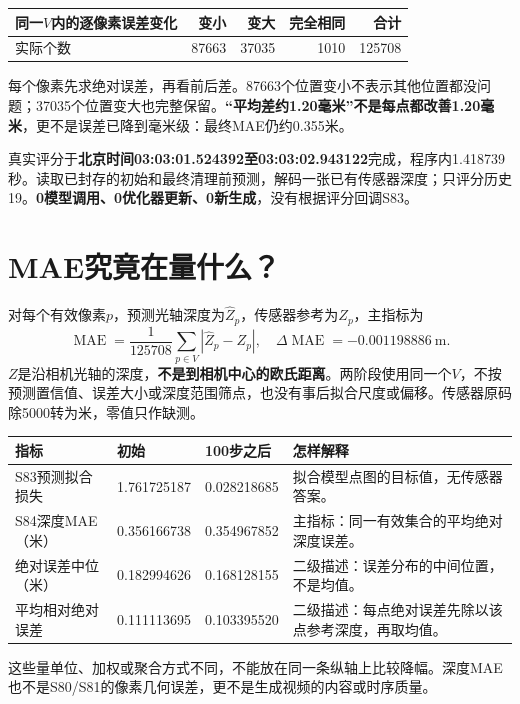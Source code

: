 \documentclass[UTF8,11pt,a4paper]{ctexart}
\begin{document}
\begin{center}\small
\begin{tabular}{lrrrr}\toprule
同一$V$内的逐像素误差变化&变小&变大&完全相同&合计\\\midrule
实际个数&87663&37035&1010&125708\\\bottomrule
\end{tabular}\end{center}
每个像素先求绝对误差，再看前后差。87663个位置变小不表示其他位置都没问题；37035个位置变大也完整保留。\textbf{“平均差约1.20毫米”不是每点都改善1.20毫米}，更不是误差已降到毫米级：最终MAE仍约0.355米。

真实评分于\textbf{北京时间03:03:01.524392至03:03:02.943122}完成，程序内1.418739秒。读取已封存的初始和最终清理前预测，解码一张已有传感器深度；只评分历史19。\textbf{0模型调用、0优化器更新、0新生成}，没有根据评分回调S83。
\clearpage

\section{ MAE究竟在量什么？}
对每个有效像素$p$，预测光轴深度为$\hat Z_p$，传感器参考为$Z_p$，主指标为
\[
\operatorname{MAE}=\frac{1}{125708}\sum_{p\in V}|\hat Z_p-Z_p|,
\quad \Delta\operatorname{MAE}=-0.001198886\ \mathrm{m}.
\]
$Z$是沿相机光轴的深度，\textbf{不是到相机中心的欧氏距离}。两阶段使用同一个$V$，不按预测置信值、误差大小或深度范围筛点，也没有事后拟合尺度或偏移。传感器原码除5000转为米，零值只作缺测。

\begin{center}\small
\begin{tabular}{p{3.6cm}p{3.0cm}p{3.0cm}p{5.0cm}}\toprule
指标&初始&100步之后&怎样解释\\\midrule
S83预测拟合损失&1.761725187&0.028218685&拟合模型点图的目标值，无传感器答案。\\
S84深度MAE（米）&0.356166738&0.354967852&主指标：同一有效集合的平均绝对深度误差。\\
绝对误差中位（米）&0.182994626&0.168128155&二级描述：误差分布的中间位置，不是均值。\\
平均相对绝对误差&0.111113695&0.103395520&二级描述：每点绝对误差先除以该点参考深度，再取均值。\\\bottomrule
\end{tabular}\end{center}
这些量单位、加权或聚合方式不同，不能放在同一条纵轴上比较降幅。深度MAE也不是S80/S81的像素几何误差，更不是生成视频的内容或时序质量。
\end{document}
